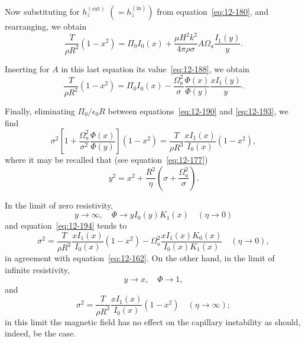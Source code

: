 Now substituting for $h_z^{(\mathrm{ext})}$ $(= h_z^{(\mathrm{in})})$ from equation~\eqref{eq:12-180}, and rearranging, we obtain
\begin{equation}
\label{eq:12-192}
\frac{T}{\rho R^2}(1-x^2) = \Pi_0 I_0(x) + \frac{\mu H^2 k^2}{4\pi\rho\sigma}A\Omega_a \frac{I_1(y)}{y}.
\end{equation}

Inserting for $A$ in this last equation its value~\eqref{eq:12-188}, we obtain
\begin{equation}
\label{eq:12-193}
\frac{T}{\rho R^2}(1-x^2) = \Pi_0 I_0(x) - \frac{\Omega_a^2}{\sigma}\frac{\Phi(x)}{\Phi(y)}\frac{xI_1(y)}{y}.
\end{equation}

Finally, eliminating $\Pi_0/\epsilon_0 R$ between equations~\eqref{eq:12-190} and \eqref{eq:12-193}, we find
\begin{equation}
\label{eq:12-194}
\sigma^2\left[1 + \frac{\Omega_a^2}{\sigma^2}\frac{\Phi(x)}{\Phi(y)}\right](1-x^2) = \frac{T}{\rho R^3}\frac{xI_1(x)}{I_0(x)}(1-x^2),
\end{equation}
where it may be recalled that (see equation~\eqref{eq:12-177})
\begin{equation}
\label{eq:12-195}
y^2 = x^2 + \frac{R^2}{\eta}\left(\sigma + \frac{\Omega_a^2}{\sigma}\right).
\end{equation}

In the limit of zero resistivity,
\begin{equation}
\label{eq:12-196}
y \to \infty, \quad \Phi \to y I_0(y) K_1(x) \quad (\eta \to 0)
\end{equation}
and equation~\eqref{eq:12-194} tends to
\begin{equation}
\label{eq:12-197}
\sigma^2 = \frac{T}{\rho R^3}\frac{xI_1(x)}{I_0(x)}(1-x^2) - \Omega_a^2 \frac{x I_1(x)K_0(x)}{I_0(x)K_1(x)} \quad (\eta \to 0),
\end{equation}
in agreement with equation~\eqref{eq:12-162}. On the other hand, in the limit of infinite resistivity,
\begin{equation}
\label{eq:12-198}
y \to x, \quad \Phi \to 1,
\end{equation}
and
\begin{equation}
\label{eq:12-199}
\sigma^2 = \frac{T}{\rho R^3}\frac{xI_1(x)}{I_0(x)}(1-x^2) \quad (\eta \to \infty);
\end{equation}
in this limit the magnetic field has no effect on the capillary instability as should, indeed, be the case.

